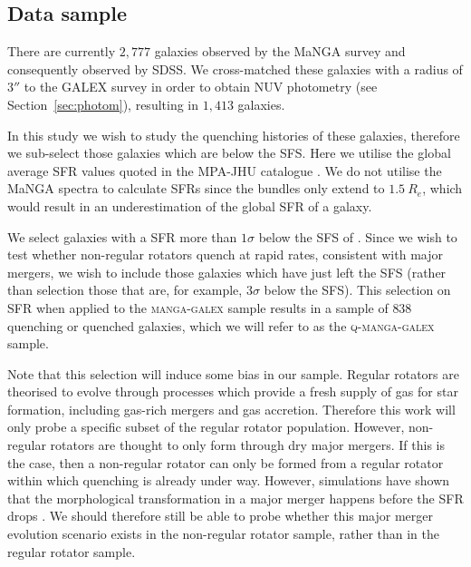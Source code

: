\documentclass[useAMS,usenatbib]{mn2e}
\begin{document}
\subsection{Data sample}\label{sec:mangasample}

There are currently $2,777$ galaxies observed by the MaNGA survey and consequently observed by SDSS. We cross-matched these galaxies with a radius of $3''$ to the GALEX survey in order to obtain NUV photometry (see Section~\ref{sec:photom}), resulting in $1,413$ galaxies.

In this study we wish to study the quenching histories of these galaxies, therefore we sub-select those galaxies which are below the SFS. Here we utilise the global average SFR values quoted in the MPA-JHU catalogue \citep[][which are corrected for aperture bias]{kauffmann03, brinchmann04}. We do not utilise the MaNGA spectra to calculate SFRs since the bundles only extend to $1.5~R_e$, which would result in an underestimation of the global SFR of a galaxy. 

We select galaxies with a SFR more than $1\sigma$ below the SFS of \cite{peng10}. Since we wish to test whether non-regular rotators quench at rapid rates, consistent with major mergers, we wish to include those galaxies which have just left the SFS (rather than selection those that are, for example, $3\sigma$ below the SFS).
This selection on SFR when applied to the \textsc{manga-galex} sample results in a sample of $838$ quenching or quenched galaxies, which we will refer to as the \textsc{q-manga-galex} sample. %

Note that this selection will induce some bias in our sample. Regular rotators are theorised to evolve through processes which provide a fresh supply of gas for star formation, including gas-rich mergers and gas accretion. Therefore this work will only probe a specific subset of the regular rotator population. However, non-regular rotators are thought to only form through dry major mergers. If this is the case, then a non-regular rotator can only be formed from a regular rotator within which quenching is already under way. However, simulations have shown that the morphological transformation in a major merger happens before the SFR drops \cite[e.g. see][]{sparre16}. We should therefore still be able to probe whether this major merger evolution scenario exists in the non-regular rotator sample, rather than in the regular rotator sample.   
\end{document}
